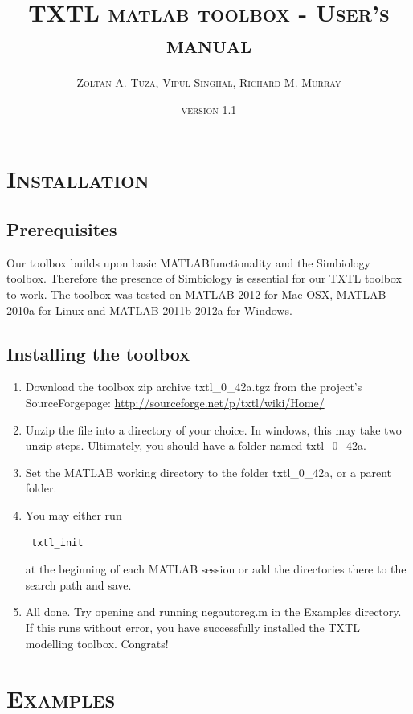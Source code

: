 \documentclass[english]{report}
\begin{document}
\title{\textsc{TXTL matlab toolbox - User's manual}}
\date{\textsc{version 1.1}}
\author{\textsc{Zoltan A. Tuza, Vipul Singhal, Richard M. Murray}}
\maketitle
\textsc{\tableofcontents}



\chapter{\textsc{Installation}}
	\section{Prerequisites}
	Our toolbox builds upon basic MATLAB\texttrademark  functionality and the Simbiology toolbox. Therefore the presence of Simbiology is essential for our TXTL toolbox to work. The toolbox was tested on MATLAB 2012 for Mac OSX, MATLAB 2010a for Linux and MATLAB 2011b-2012a for Windows. 
	\section{Installing the toolbox}
	\begin{enumerate}
\item Download the toolbox zip archive \textsf{txtl\_0\_42a.tgz} from the project's SourceForge\texttrademark page: \url{http://sourceforge.net/p/txtl/wiki/Home/}
\item Unzip the file into a directory of your choice. In windows, this may take two unzip steps. Ultimately, you should have a folder named txtl\_0\_42a. 
\item Set the MATLAB working directory to the folder txtl\_0\_42a, or a parent folder. 
\item You may either run \begin{verbatim} txtl_init  \end{verbatim} at the
beginning of each MATLAB session or add the directories there to the search path and save. 
\item All done. Try opening and running \textsf{negautoreg.m} in the \textsf{Examples} directory. If this runs without error, you have successfully installed the TXTL modelling toolbox. Congrats!
\end{enumerate}
	

					
\chapter{\textsc{Examples}}
\end{document}
